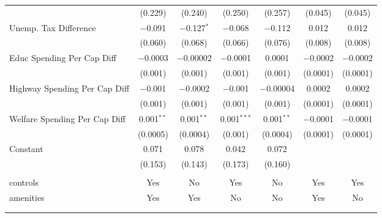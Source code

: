 \begin{table}[!htbp]
\begin{tabular}{@{\extracolsep{5pt}}lcccccc}
  & (0.229) & (0.240) & (0.250) & (0.257) & (0.045) & (0.045) \\ 
  Unemp. Tax Difference & $-$0.091 & $-$0.127$^{*}$ & $-$0.068 & $-$0.112 & 0.012 & 0.012 \\ 
  & (0.060) & (0.068) & (0.066) & (0.076) & (0.008) & (0.008) \\ 
  Educ Spending Per Cap Diff & $-$0.0003 & $-$0.00002 & $-$0.0001 & 0.0001 & $-$0.0002 & $-$0.0002 \\ 
  & (0.001) & (0.001) & (0.001) & (0.001) & (0.0001) & (0.0001) \\ 
  Highway Spending Per Cap Diff & $-$0.001 & $-$0.0002 & $-$0.001 & $-$0.00004 & 0.0002 & 0.0002 \\ 
  & (0.001) & (0.001) & (0.001) & (0.001) & (0.0001) & (0.0001) \\ 
  Welfare Spending Per Cap Diff & 0.001$^{**}$ & 0.001$^{**}$ & 0.001$^{***}$ & 0.001$^{**}$ & $-$0.0001 & $-$0.0001 \\ 
  & (0.0005) & (0.0004) & (0.001) & (0.0004) & (0.0001) & (0.0001) \\ 
  Constant & 0.071 & 0.078 & 0.042 & 0.072 &  &  \\ 
  & (0.153) & (0.143) & (0.173) & (0.160) &  &  \\ 
 \hline \\[-1.8ex] 
controls & Yes & No & Yes & No & Yes & Yes \\ 
amenities & Yes & Yes & No & No & Yes & No \\ 
\hline \\[-1.8ex] 
\hline 
\hline \\[-1.8ex] 
\end{tabular} 
\end{table} 
